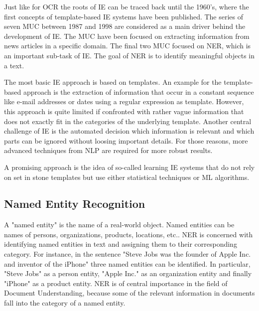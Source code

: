 Just like for \ac{OCR} the roots of \ac{IE} can be traced back until the 1960's, where the first concepts of template-based \ac{IE} systems have been published. The series of seven \ac{MUC} between 1987 and 1998 are considered as a main driver behind the development of \ac{IE}. The \ac{MUC} have been focused on extracting information from news articles in a specific domain. The final two \acs{MUC} focused on \acf{NER}, which is an important sub-task of \ac{IE}. The goal of \ac{NER} is to identify meaningful objects in a text.
\cite{hobbs2010information,cowie1996information,black1998facile}

The most basic \ac{IE} approach is based on templates. An example for the template-based approach is the extraction of information that occur in a constant sequence like e-mail addresses or dates using a regular expression as template. However, this approach is quite limited if confronted with rather vague information that does not exactly fit in the categories of the underlying template. Another central challenge of \acf{IE} is the automated decision which information is relevant and which parts can be ignored without loosing important details. For those reasons, more advanced techniques from \ac{NLP} are required for more robust results.
\cite{Wilks1997InformationEA,cowie1996information}

A promising approach is the idea of so-called learning \acf{IE} systems that do not rely on set in stone templates but use either statistical techniques or \ac{ML} algorithms. 
\cite{hobbs2010information,cardie1997empirical}

\subsection{Named Entity Recognition}
A "named entity" is the name of a real-world object. Named entities can be names of persons, organizations, products, locations, etc..
\acf{NER} is concerned with identifying named entities in text and assigning them to their corresponding category. For instance, in the sentence "Steve Jobs was the founder of Apple Inc. and inventor of the iPhone" three named entities can be identified. In particular, "Steve Jobs" as a person entity, "Apple Inc." as an organization entity and finally "iPhone" as a product entity. \ac{NER} is of central importance in the field of Document Understanding, because some of the relevant information in documents fall into the category of a named entity. \cite{hobbs2010information,black1998facile}


